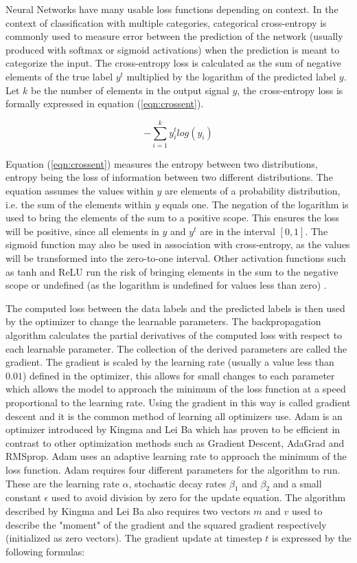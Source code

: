 Neural Networks have many usable loss functions depending on context. In the context of classification with multiple categories, categorical cross-entropy is commonly used to measure error between the prediction of the network (usually produced with softmax or sigmoid activations) when the prediction is meant to categorize the input. The cross-entropy loss is calculated as the sum of negative elements of the true label $y^t$ multiplied by the logarithm of the predicted label $y$. Let $k$ be the number of elements in the output signal $y$, the cross-entropy loss is formally expressed in equation (\ref{eqn:crossent}).

\begin{equation}
\label{eqn:crossent}
-\sum_{i=1}^k y_{i}^t log(y_i)
\end{equation}

Equation (\ref{eqn:crossent}) measures the entropy between two distributions, entropy being the loss of information between two different distributions. The equation assumes the values within $y$ are elements of a probability distribution, i.e. the sum of the elements within $y$ equals one. The negation of the logarithm is used to bring the elements of the sum to a positive scope. This ensures the loss will be positive, since all elements in $y$ and $y^t$ are in the interval $[0, 1]$. The sigmoid function may also be used in association with cross-entropy, as the values will be transformed into the zero-to-one interval. Other activation functions such as tanh and ReLU run the risk of bringing elements in the sum to the negative scope or undefined (as the logarithm is undefined for values less than zero) \cite{krippendorff2009mathematical, shannon2001mathematical}.

The computed loss between the data labels and the predicted labels is then used by the optimizer to change the learnable parameters. The backpropagation algorithm calculates the partial derivatives of the computed loss with respect to each learnable parameter. The collection of the derived parameters are called the gradient. The gradient is scaled by the learning rate (usually a value less than $0.01$) defined in the optimizer, this allows for small changes to each parameter which allows the model to approach the minimum of the loss function at a speed proportional to the learning rate. Using the gradient in this way is called gradient descent and it is the common method of learning all optimizers use. Adam is an optimizer introduced by Kingma and Lei Ba \cite{kingma2014adam} which has proven to be efficient in contrast to other optimization methods such as Gradient Descent, AdaGrad and RMSprop. Adam uses an adaptive learning rate to approach the minimum of the loss function. Adam requires four different parameters for the algorithm to run. These are the learning rate $\alpha$, stochastic decay rates $\beta_1$ and $\beta_2$ and a small constant $\epsilon$ used to avoid division by zero for the update equation. The algorithm described by Kingma and Lei Ba also requires two vectors $m$ and $v$ used to describe the "moment" of the gradient and the squared gradient respectively (initialized as zero vectors). The gradient update at timestep $t$ is expressed by the following formulas:

